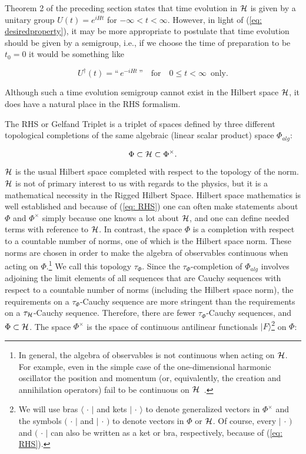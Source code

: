 \documentclass[12pt]{article}
\begin{document}
Theorem 2 of the preceding section states that time evolution in ${\cal H}$ is given by a unitary group $U(t) = e^{iHt}$ for $-\infty < t < \infty$.  However, in light of (\ref{eq: desiredproperty}), it may be more appropriate to postulate that time evolution should be given by a semigroup, i.e., if we choose the time of preparation to be $t_0 = 0$ it would be something like

\begin{equation}
U^{\dagger}(t) = \mbox{``}\,e^{-iHt}\,\mbox{''} \,\,\,\,\,\, \mbox{for} \,\,\,\,\,\, 0 \leq t < \infty \,\,\,\mbox{only}.    \label{eq: semigroup}
\end{equation}

\noindent Although such a time evolution semigroup cannot exist in the Hilbert space ${\cal H}$, it does have a natural place in the RHS formalism.

The RHS or Gelfand Triplet is a triplet of spaces defined by three different topological completions of the same algebraic (linear scalar product) space $\Phi_{alg}$:

\begin{equation}
\Phi \subset {\cal H} \subset \Phi^{\times}.   \label{eq: RHS}
\end{equation}

\noindent ${\cal H}$ is the usual Hilbert space completed with respect to the topology of the norm.  ${\cal H}$ is not of primary interest to us with regards to the physics, but it is a mathematical necessity in the Rigged Hilbert Space.  Hilbert space mathematics is well established and because of (\ref{eq: RHS}) one can often make statements about $\Phi$ and $\Phi^{\times}$ simply because one knows a lot about ${\cal H}$, and one can define needed terms with reference to ${\cal H}$.  In contrast, the space $\Phi$ is a completion with respect to a countable number of norms, one of which is the Hilbert space norm.  These norms are chosen in order to make the algebra of observables continuous when acting on $\Phi$.\footnote{In general, the algebra of observables is not continuous when acting on ${\cal H}$.  For example, even in the simple case of the one-dimensional harmonic oscillator the position and momentum (or, equivalently, the creation and annihilation operators) fail to be continuous on ${\cal H}$~\cite{Bohm.Gadella}.}  We call this topology $\tau_{\Phi}$.  Since the $\tau_\Phi$-completion of $\Phi_{alg}$ involves adjoining the limit elements of all sequences that are Cauchy sequences with respect to a countable number of norms (including the Hilbert space norm), the requirements on a $\tau_{\Phi}$-Cauchy sequence are more stringent than the requirements on a $\tau_{\cal H}$-Cauchy sequence.  Therefore, there are fewer $\tau_{\Phi}$-Cauchy sequences, and $\Phi \subset {\cal H}$.  The space $\Phi^{\times}$ is the space of continuous antilinear functionals $|F\rangle$\footnote{We will use bras $\langle \,\cdot\, |$ and kets $| \,\cdot\, \rangle$ to denote generalized vectors in $\Phi^{\times}$ and the symbols $(\,\cdot\,|$ and $|\,\cdot\,)$ to denote vectors in $\Phi$ or ${\cal H}$.  Of course, every $|\,\cdot\,)$ and $( \,\cdot\, |$ can also be written as a ket or bra, respectively, because of (\ref{eq: RHS}).} on $\Phi$:
\end{document}
